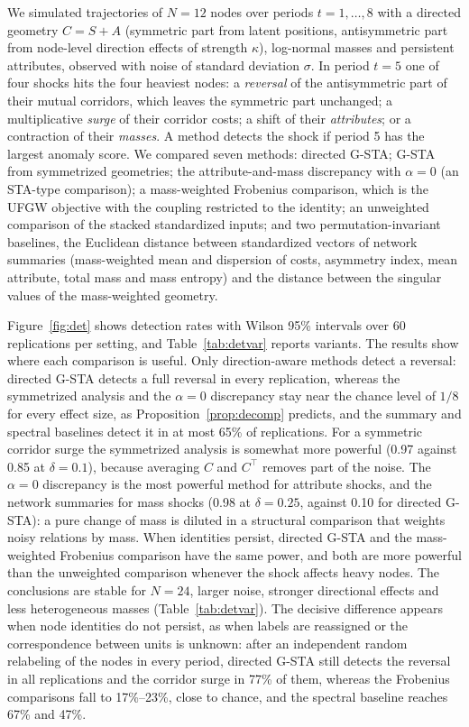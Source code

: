 \documentclass[12pt]{article}
\theoremstyle{definition}
\begin{document}
We simulated trajectories of $N=12$ nodes over periods $t=1,\dots,8$ with a directed geometry $C=S+A$ (symmetric part from latent positions, antisymmetric part from node-level direction effects of strength $\kappa$), log-normal masses and persistent attributes, observed with noise of standard deviation $\sigma$. In period $t=5$ one of four shocks hits the four heaviest nodes: a \emph{reversal} of the antisymmetric part of their mutual corridors, which leaves the symmetric part unchanged; a multiplicative \emph{surge} of their corridor costs; a shift of their \emph{attributes}; or a contraction of their \emph{masses}. A method detects the shock if period 5 has the largest anomaly score. We compared seven methods: directed G-STA; G-STA from symmetrized geometries; the attribute-and-mass discrepancy with $\alpha=0$ (an STA-type comparison); a mass-weighted Frobenius comparison, which is the UFGW objective with the coupling restricted to the identity; an unweighted comparison of the stacked standardized inputs; and two permutation-invariant baselines, the Euclidean distance between standardized vectors of network summaries (mass-weighted mean and dispersion of costs, asymmetry index, mean attribute, total mass and mass entropy) and the distance between the singular values of the mass-weighted geometry.

Figure~\ref{fig:det} shows detection rates with Wilson 95\% intervals over 60 replications per setting, and Table~\ref{tab:detvar} reports variants. The results show where each comparison is useful. Only direction-aware methods detect a reversal: directed G-STA detects a full reversal in every replication, whereas the symmetrized analysis and the $\alpha=0$ discrepancy stay near the chance level of $1/8$ for every effect size, as Proposition~\ref{prop:decomp} predicts, and the summary and spectral baselines detect it in at most 65\% of replications. For a symmetric corridor surge the symmetrized analysis is somewhat more powerful (0.97 against 0.85 at $\delta=0.1$), because averaging $C$ and $C^\top$ removes part of the noise. The $\alpha=0$ discrepancy is the most powerful method for attribute shocks, and the network summaries for mass shocks (0.98 at $\delta=0.25$, against 0.10 for directed G-STA): a pure change of mass is diluted in a structural comparison that weights noisy relations by mass. When identities persist, directed G-STA and the mass-weighted Frobenius comparison have the same power, and both are more powerful than the unweighted comparison whenever the shock affects heavy nodes. The conclusions are stable for $N=24$, larger noise, stronger directional effects and less heterogeneous masses (Table~\ref{tab:detvar}). The decisive difference appears when node identities do not persist, as when labels are reassigned or the correspondence between units is unknown: after an independent random relabeling of the nodes in every period, directed G-STA still detects the reversal in all replications and the corridor surge in 77\% of them, whereas the Frobenius comparisons fall to 17\%--23\%, close to chance, and the spectral baseline reaches 67\% and 47\%.
\end{document}
